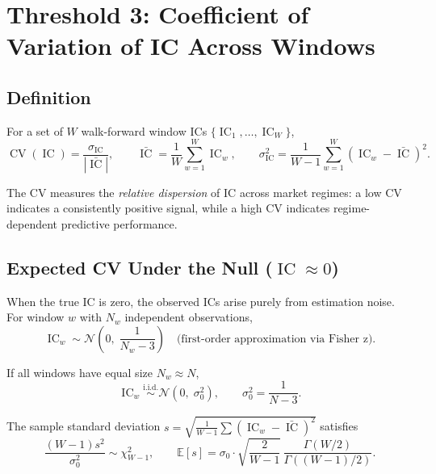 \documentclass[11pt,a4paper]{article}
\theoremstyle{definition}
\newcommand{\IC}{\operatorname{IC}}
\newcommand{\E}{\mathbb{E}}
\newcommand{\CV}{\operatorname{CV}}
\newcommand{\N}{\mathcal{N}}
\newcommand{\iid}{\overset{\text{i.i.d.}}{\sim}}
\begin{document}
\section{Threshold 3: Coefficient of Variation of IC Across Windows}

\subsection{Definition}

For a set of $W$ walk-forward window ICs $\{\IC_1,\dots,\IC_W\}$,
\begin{equation}
    \CV(\IC) = \frac{\sigma_{\IC}}{|\bar{\IC}|},
    \qquad \bar{\IC} = \frac{1}{W}\sum_{w=1}^{W} \IC_w,
    \qquad \sigma_{\IC}^2 = \frac{1}{W-1}\sum_{w=1}^{W} (\IC_w - \bar{\IC})^2.
\end{equation}

The CV measures the \emph{relative dispersion} of IC across market regimes:
a low CV indicates a consistently positive signal, while a high CV indicates
regime-dependent predictive performance.

\subsection{Expected CV Under the Null (\texorpdfstring{$\IC \approx 0$}{IC near 0})}

When the true IC is zero, the observed ICs arise purely from estimation
noise.  For window $w$ with $N_w$ independent observations,
\begin{equation}
    \IC_w \sim \N\!\left(0,\;\frac{1}{N_w-3}\right)
    \quad\text{(first-order approximation via Fisher z)}.
\end{equation}

If all windows have equal size $N_w \approx N$,
\begin{equation}
    \IC_w \iid \N\!\left(0,\;\sigma_0^2\right),
    \qquad \sigma_0^2 = \frac{1}{N - 3}.
\end{equation}

The sample standard deviation $s = \sqrt{\frac{1}{W-1}\sum (\IC_w - \bar{\IC})^2}$
satisfies
\begin{equation}
    \frac{(W-1)s^2}{\sigma_0^2} \sim \chi_{W-1}^2,
    \qquad \E[s] = \sigma_0 \cdot \sqrt{\frac{2}{W-1}}\,
                  \frac{\Gamma(W/2)}{\Gamma((W-1)/2)}.
\end{equation}
\end{document}
